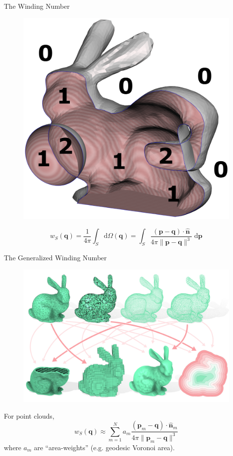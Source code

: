 \documentclass[10pt]{beamer}
\newcommand{\bp}{\mathbf{p}}
\newcommand{\bq}{\mathbf{q}}
\newcommand{\bn}{\mathbf{n}}
\begin{document}
{
\begin{frame}{The Winding Number}
    \begin{figure}
        \centering
        \includegraphics[width=0.4\linewidth]{figures/wn/wn.png}
    \end{figure}
    
    \begin{equation*}
        w_S(\bq) = \frac{1}{4\pi} \int_{S} \mathrm{d}\Omega(\bq) = \int_{S} \frac{(\bp - \bq) \cdot \widehat{\bn}}{4\pi \|\bp - \bq\|^3} \; \mathrm{d}\bp
    \end{equation*}
\end{frame}
}

{
\begin{frame}{The \alert{Generalized} Winding Number}
    \begin{figure}
        \centering
        \includegraphics[width=0.6\linewidth]{figures/wn/gwn.png}
    \end{figure}

    For point clouds,
    \begin{equation*}
        w_S(\bq) \approx \sum_{m=1}^{N} a_m \frac{(\bp_m - \bq)\cdot \widehat{\bn}_m}{4\pi\|\bp_m - \bq\|^3}
    \end{equation*}
    where \(a_m\) are ``area-weights'' (e.g. geodesic Voronoi area).
\end{frame}
}
\end{document}
